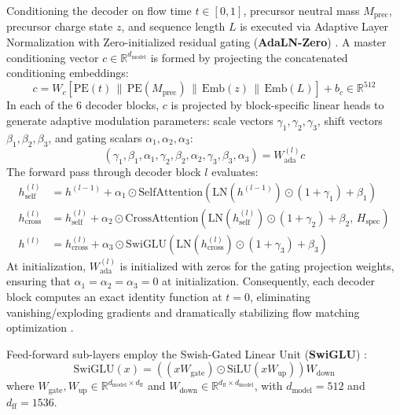 Conditioning the decoder on flow time $t \in [0, 1]$, precursor neutral mass $M_{\text{prec}}$, precursor charge state $z$, and sequence length $L$ is executed via Adaptive Layer Normalization with Zero-initialized residual gating (\textbf{AdaLN-Zero}) \citep{Peebles2023}. A master conditioning vector $c \in \mathbb{R}^{d_{\text{model}}}$ is formed by projecting the concatenated conditioning embeddings:
\begin{equation}
c = W_c \left[ \text{PE}(t) \,\|\, \text{PE}(M_{\text{prec}}) \,\|\, \text{Emb}(z) \,\|\, \text{Emb}(L) \right] + b_c \in \mathbb{R}^{512}
\label{eq:condition_vector}
\end{equation}
In each of the 6 decoder blocks, $c$ is projected by block-specific linear heads to generate adaptive modulation parameters: scale vectors $\gamma_1, \gamma_2, \gamma_3$, shift vectors $\beta_1, \beta_2, \beta_3$, and gating scalars $\alpha_1, \alpha_2, \alpha_3$:
\begin{equation}
(\gamma_1, \beta_1, \alpha_1, \gamma_2, \beta_2, \alpha_2, \gamma_3, \beta_3, \alpha_3) = W_{\text{ada}}^{(l)} c
\label{eq:adaln_projections}
\end{equation}
The forward pass through decoder block $l$ evaluates:
\begin{align}
h_{\text{self}}^{(l)} &= h^{(l-1)} + \alpha_1 \odot \text{SelfAttention}\left( \text{LN}(h^{(l-1)}) \odot (1 + \gamma_1) + \beta_1 \right) \label{eq:decoder_self_attn} \\
h_{\text{cross}}^{(l)} &= h_{\text{self}}^{(l)} + \alpha_2 \odot \text{CrossAttention}\left( \text{LN}(h_{\text{self}}^{(l)}) \odot (1 + \gamma_2) + \beta_2, \, H_{\text{spec}} \right) \label{eq:decoder_cross_attn} \\
h^{(l)} &= h_{\text{cross}}^{(l)} + \alpha_3 \odot \text{SwiGLU}\left( \text{LN}(h_{\text{cross}}^{(l)}) \odot (1 + \gamma_3) + \beta_3 \right) \label{eq:decoder_swiglu}
\end{align}
At initialization, $W_{\text{ada}}^{(l)}$ is initialized with zeros for the gating projection weights, ensuring that $\alpha_1 = \alpha_2 = \alpha_3 = 0$ at initialization. Consequently, each decoder block computes an exact identity function at $t=0$, eliminating vanishing/exploding gradients and dramatically stabilizing flow matching optimization \citep{Peebles2023}.

Feed-forward sub-layers employ the Swish-Gated Linear Unit (\textbf{SwiGLU}) \citep{Shazeer2020}:
\begin{equation}
\text{SwiGLU}(x) = \left( (x W_{\text{gate}}) \odot \text{SiLU}(x W_{\text{up}}) \right) W_{\text{down}}
\label{eq:swiglu}
\end{equation}
where $W_{\text{gate}}, W_{\text{up}} \in \mathbb{R}^{d_{\text{model}} \times d_{\text{ff}}}$ and $W_{\text{down}} \in \mathbb{R}^{d_{\text{ff}} \times d_{\text{model}}}$, with $d_{\text{model}} = 512$ and $d_{\text{ff}} = 1536$.

